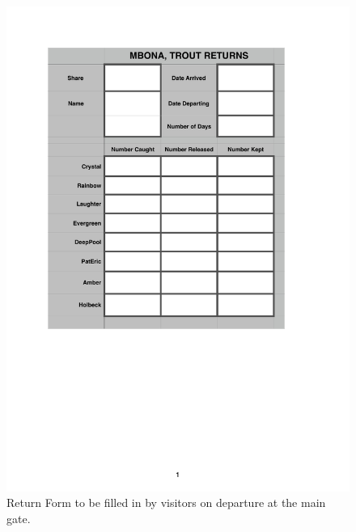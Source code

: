 \begin{appendices}
\begin{figure}[H]
\centering
  \includegraphics[scale=1]{tables/TablesTroutReturns.pdf}
   \caption{Return Form to be filled in by visitors on departure at the main gate.}
  \label{fig:TroutReturnForm}
\end{figure}




\end{appendices}
